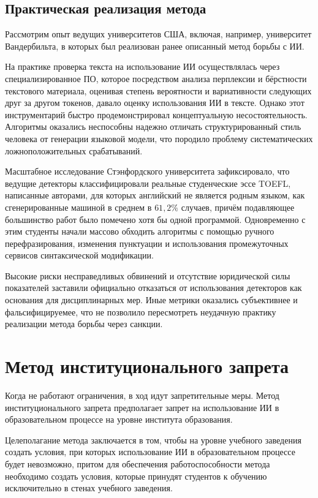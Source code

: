 \documentclass[12pt,a4paper]{article}
\begin{document}
\subsection{Практическая реализация метода}

Рассмотрим опыт ведущих университетов США, включая, например, университет Вандербильта, в
которых был реализован ранее описанный метод борьбы с ИИ. 

На практике проверка текста
на использование ИИ осуществлялась через специализированное ПО, которое посредством
анализа перплексии и бёрстности текстового материала, оценивая степень вероятности и 
вариативности следующих друг за другом токенов, давало оценку использования ИИ в тексте. 
Однако этот инструментарий быстро продемонстрировал концептуальную несостоятельность. 
Алгоритмы оказались неспособны надежно отличать структурированный стиль человека от 
генерации языковой модели, что породило проблему систематических ложноположительных 
срабатываний. 

Масштабное исследование Стэнфордского университета зафиксировало, что 
ведущие детекторы классифицировали реальные студенческие эссе TOEFL, написанные 
авторами, для которых английский не является родным языком, как сгенерированные машиной 
в среднем в $61{,}2\%$ случаев, причём подавляющее большинство работ было помечено хотя 
бы одной программой. Одновременно с этим студенты начали массово обходить алгоритмы с 
помощью ручного перефразирования, изменения пунктуации и использования промежуточных 
сервисов синтаксической модификации. 

Высокие риски несправедливых обвинений и 
отсутствие юридической силы показателей заставили официально отказаться от 
использования детекторов как основания для дисциплинарных мер. Иные метрики оказались
субъективнее и фальсифицируемее, что не позволило пересмотреть неудачную практику 
реализации метода борьбы через санкции.

\section{Метод институционального запрета}

Когда не работают ограничения, в ход идут запретительные меры. Метод институционального 
запрета предполагает запрет на использование ИИ в образовательном процессе на уровне
института образования. 

Целеполагание метода заключается в том, чтобы на уровне 
учебного заведения создать условия, при которых использование ИИ в образовательном
процессе будет невозможно, притом для обеспечения работоспособности метода необходимо 
создать условия, которые принудят студентов к обучению исключительно в стенах учебного 
заведения.
\end{document}
